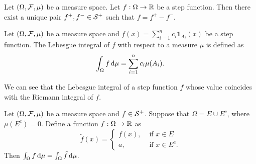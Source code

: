 \begin{corollary}
  Let $(\Omega, \F, \mu)$ be a measure space. Let $f:\Omega\to\RR$ be a step function. Then there exist a unique pair $f^+, f^-\in \S^+$ such that $f = f^+ - f^-$.
\end{corollary}

\begin{definition}
  Let $(\Omega,\F,\mu)$ be a measure space and $f(x)=\sum\limits_{i=1}^nc_i\mathbf{1}_{A_i}(x)$ be a step function. The Lebesgue integral of $f$ with respect to a measure $\mu$ is defined as
  $$\int_\Omega f \d \mu = \sum\limits_{i=1}^nc_i\mu(A_i).$$
\end{definition}

We can see that the Lebesgue integral of a step function $f$ whose value coincides with the Riemann integral of $f$.

\begin{proposition}
  \label{proposition:integral-of-almost-everywhere-equal-step-functions}
  Let $(\Omega, \F, \mu)$ be a measure space and $f\in\S^+$. Suppose that $\Omega = E\cup E^c$, where $\mu(E^c) = 0$. Define a function $\tilde{f}:\Omega\to\RR$ as
  $$\tilde{f}(x) =\begin{cases}
      f(x), & \text{ if } x\in E    \\
      a,    & \text{ if } x\in E^c.
    \end{cases}$$
  Then $\int_\Omega f \d \mu = \int_\Omega \tilde{f} \d \mu$.
\end{proposition}

